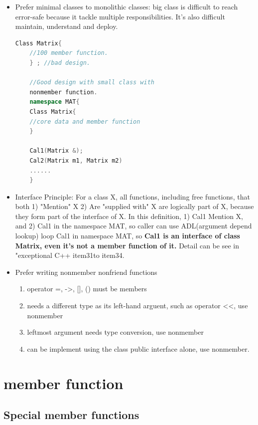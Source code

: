 \documentclass[a4paper,12pt,twoside]{book}
\begin{document}
\begin{itemize}
	\item Prefer minimal classes to monolithic classes: big class is difficult to reach error-safe because it tackle multiple responsibilities. It's also difficult maintain, understand and deploy.
	\begin{lstlisting}[frame=single, language=c++]
	Class Matrix{
	//100 member function.
	} ; //bad design.
	
	//Good design with small class with
	nonmember function.
	namespace MAT{
	Class Matrix{
	//core data and member function
	}
	
	Cal1(Matrix &);
	Cal2(Matrix m1, Matrix m2)
	......
	}
	\end{lstlisting}
	
	\item Interface Principle: For a class X, all functions, including free functions, that both
	1) "Mention" X 2) Are "supplied with" X  are logically part of X, because they form part of the interface of X.  In this definition, 1) Cal1 Mention X,  and 2) Cal1 in the namespace MAT, so caller can use ADL(argument depend lookup) loop Cal1 in namespace MAT, so \textbf{Cal1 is an interface of class Matrix, even it's not a member function of it.} Detail can be see in "exceptional C++ item31to item34.
	
	\item Prefer writing nonmember nonfriend functions
	\begin{enumerate}
		\item operator =, ->, [], () must be members
		\item needs a different type as its left-hand arguent, such as operator <<, use nonmember
		\item leftmost argument needs type conversion, use nonmember
		\item can be implement using the class public interface alone, use nonmember.
	\end{enumerate}
	
\end{itemize}



\section{member function}

\subsection{Special member functions}
\end{document}
